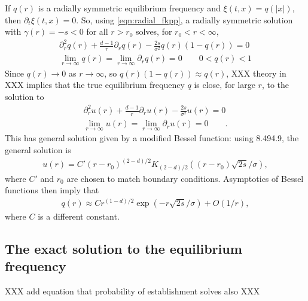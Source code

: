 \documentclass{article}
\begin{document}
If $q(r)$ is a radially symmetric equilibrium frequency and $\xi(t,x)=q(|x|)$,
then $\partial_t \xi(t,x) = 0$.
So, using \eqref{eqn:radial_fkpp}, a radially symmetric solution 
with $\gamma(r) = -s < 0$ for all $r>r_0$ 
solves, for $r_0 < r < \infty$,
\begin{align}
    \partial_r^2 q(r) + \frac{d-1}{r} \partial_r q(r) - \frac{2s}{\sigma^2} q(r) (1-q(r)) = 0 \\
    \lim_{r \to \infty} q(r) = \lim_{r \to \infty} \partial_r q(r) = 0 \qquad 
    0 < q(r) < 1 
\end{align}
Since $q(r) \to 0$ as $r \to \infty$, so $q(r) (1-q(r)) \approx q(r)$,
XXX theory in \citet{wasow1965asymptotic} XXX
implies that the true equilibrium frequency $q$ is close, for large $r$, to the solution to
\begin{align}
    \partial_r^2 u(r) + \frac{d-1}{r} \partial_r u(r) - \frac{2s}{\sigma^2} u(r) = 0  \label{eqn:bessel} \\
    \lim_{r \to \infty} u(r) = \lim_{r \to \infty} \partial_r u(r) = 0 \qquad  .
\end{align}
This has general solution given by a modified Bessel function:
using \citet{gradshteyn2007table} 8.494.9,
the general solution is
\begin{align}
    u(r) = C' (r-r_0)^{(2-d)/2} K_{(2-d)/2} \left( (r-r_0) \sqrt{2s}/\sigma \right) ,
\end{align}
where $C'$ and $r_0$ are chosen to match boundary conditions.
Asymptotics of Bessel functions \citep[][8.451.6]{gradshteyn2007table} then imply that
\begin{align}
    q(r) \approx C r^{(1-d)/2} \exp \left( -r \sqrt{2s}/\sigma \right) + O(1/r),
\end{align}
where $C$ is a different constant.



\subsection{The exact solution to the equilibrium frequency}
\label{apx:elliptic_integrals}

XXX add equation that probability of establishment solves also XXX
\end{document}
